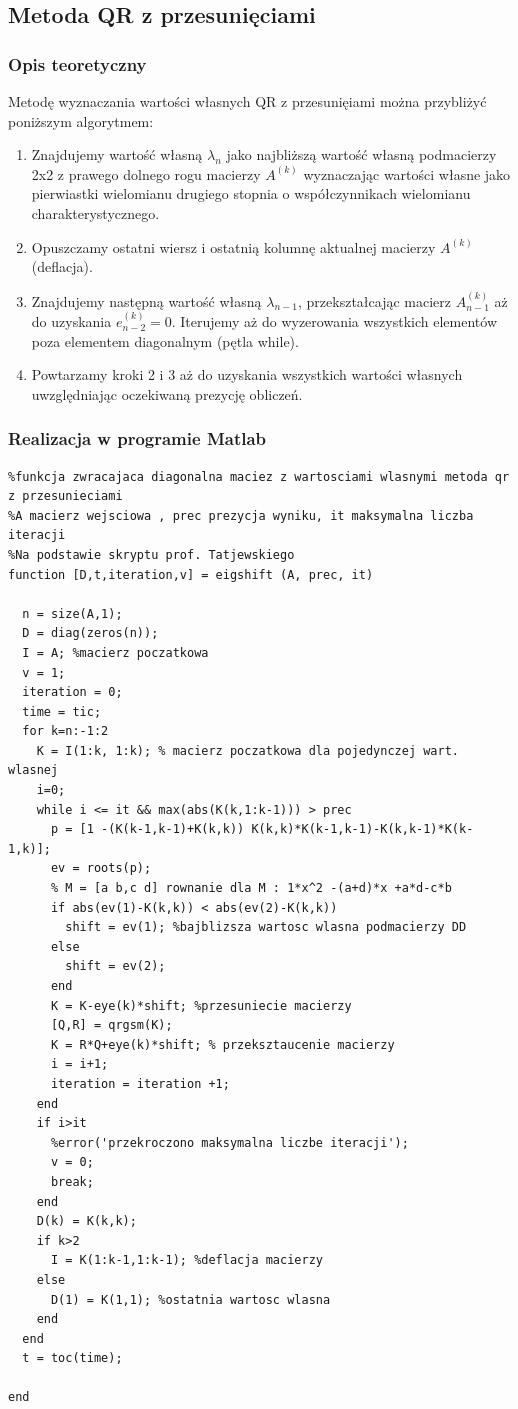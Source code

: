 \documentclass[a4paper, 11pt]{article}
\begin{document}
\subsection{Metoda QR z przesunięciami}
\subsubsection{Opis teoretyczny}
Metodę wyznaczania wartości własnych QR z przesunięiami można przybliżyć poniższym algorytmem:

\begin{enumerate}
  \item Znajdujemy wartość własną $\lambda_{n}$ jako najbliższą wartość własną podmacierzy 2x2 z prawego dolnego rogu macierzy $A^{(k)}$ wyznaczając wartości własne jako pierwiastki wielomianu drugiego stopnia o współczynnikach wielomianu charakterystycznego. 
  \item Opuszczamy ostatni wiersz i ostatnią kolumnę aktualnej macierzy $A^{(k)}$ (deflacja).
  \item Znajdujemy następną wartość własną $\lambda_{n-1}$, przekształcając macierz $A_{n-1}^{(k)}$ aż do uzyskania $e_{n-2}^{(k)} = 0$. Iterujemy aż do wyzerowania wszystkich elementów poza elementem diagonalnym (pętla while). 
  \item Powtarzamy kroki 2 i 3 aż do uzyskania wszystkich wartości własnych uwzględniając oczekiwaną prezycję obliczeń. 
\end{enumerate} 

\subsubsection{Realizacja w programie Matlab}
\begin{lstlisting}
%funkcja zwracajaca diagonalna maciez z wartosciami wlasnymi metoda qr z przesunieciami 
%A macierz wejsciowa , prec prezycja wyniku, it maksymalna liczba iteracji
%Na podstawie skryptu prof. Tatjewskiego
function [D,t,iteration,v] = eigshift (A, prec, it)

  n = size(A,1);
  D = diag(zeros(n));
  I = A; %macierz poczatkowa
  v = 1; 
  iteration = 0;
  time = tic;
  for k=n:-1:2
    K = I(1:k, 1:k); % macierz poczatkowa dla pojedynczej wart. wlasnej
    i=0; 
    while i <= it && max(abs(K(k,1:k-1))) > prec
      p = [1 -(K(k-1,k-1)+K(k,k)) K(k,k)*K(k-1,k-1)-K(k,k-1)*K(k-1,k)];
      ev = roots(p);
      % M = [a b,c d] rownanie dla M : 1*x^2 -(a+d)*x +a*d-c*b
      if abs(ev(1)-K(k,k)) < abs(ev(2)-K(k,k))
        shift = ev(1); %bajblizsza wartosc wlasna podmacierzy DD
      else
        shift = ev(2); 
      end
      K = K-eye(k)*shift; %przesuniecie macierzy
      [Q,R] = qrgsm(K); 
      K = R*Q+eye(k)*shift; % przeksztaucenie macierzy
      i = i+1;
      iteration = iteration +1;
    end
    if i>it
      %error('przekroczono maksymalna liczbe iteracji');
      v = 0; 
      break;
    end
    D(k) = K(k,k);
    if k>2
      I = K(1:k-1,1:k-1); %deflacja macierzy
    else
      D(1) = K(1,1); %ostatnia wartosc wlasna
    end
  end
  t = toc(time);
  
end

\end{lstlisting}
\end{document}
